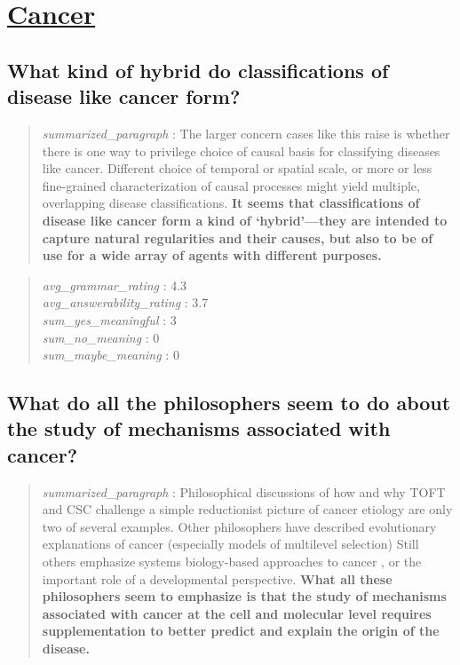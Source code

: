 \hypertarget{cancer}{%
\section{\texorpdfstring{\href{https://plato.stanford.edu/entries/cancer/index.html}{Cancer}}{Cancer}}\label{cancer}}

\hypertarget{what-kind-of-hybrid-do-classifications-of-disease-like-cancer-form}{%
\subsection{What kind of hybrid do classifications of disease like
cancer
form?}\label{what-kind-of-hybrid-do-classifications-of-disease-like-cancer-form}}

\begin{quote}
\emph{summarized\_paragraph} : The larger concern cases like this raise
is whether there is one way to privilege choice of causal basis for
classifying diseases like cancer. Different choice of temporal or
spatial scale, or more or less fine-grained characterization of causal
processes might yield multiple, overlapping disease classifications.
\textbf{It seems that classifications of disease like cancer form a kind
of `hybrid'---they are intended to capture natural regularities and
their causes, but also to be of use for a wide array of agents with
different purposes.}
\end{quote}

\begin{quote}
\emph{avg\_grammar\_rating} : 4.3\\
\emph{avg\_answerability\_rating} : 3.7\\
\emph{sum\_yes\_meaningful} : 3\\
\emph{sum\_no\_meaning} : 0\\
\emph{sum\_maybe\_meaning} : 0
\end{quote}

\hypertarget{what-do-all-the-philosophers-seem-to-do-about-the-study-of-mechanisms-associated-with-cancer}{%
\subsection{What do all the philosophers seem to do about the study of
mechanisms associated with
cancer?}\label{what-do-all-the-philosophers-seem-to-do-about-the-study-of-mechanisms-associated-with-cancer}}

\begin{quote}
\emph{summarized\_paragraph} : Philosophical discussions of how and why
TOFT and CSC challenge a simple reductionist picture of cancer etiology
are only two of several examples. Other philosophers have described
evolutionary explanations of cancer (especially models of multilevel
selection) Still others emphasize systems biology-based approaches to
cancer , or the important role of a developmental perspective.
\textbf{What all these philosophers seem to emphasize is that the study
of mechanisms associated with cancer at the cell and molecular level
requires supplementation to better predict and explain the origin of the
disease.}
\end{quote}

